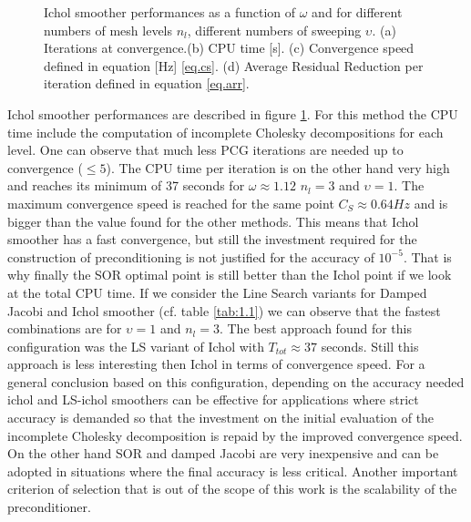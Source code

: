 \begin{figure}[hbt!]
{                                  }
                          \caption{Ichol smoother performances as a function of $\omega$ and for different numbers of mesh levels $n_l$, different numbers of sweeping $\upsilon$. (a) Iterations at convergence.(b) CPU time [s]. (c) Convergence speed defined in equation [Hz] \ref{eq.cs}. (d) Average Residual Reduction per iteration defined in equation \ref{eq.arr}. }
                          \label{f.1.34}
                        \end{figure}  
                        Ichol smoother performances are described in figure \ref{f.1.34}.  For this method the CPU time include the computation of incomplete Cholesky decompositions for each level. One can observe that much less PCG iterations are needed up to convergence ($\leq 5$). The CPU time per iteration is on the other hand very high and reaches its minimum of 37 seconds for $\omega\approx1.12$ $n_l=3$ and $\upsilon=1$. The maximum convergence speed is reached for the same point $C_S\approx 0.64 Hz$ and is bigger than the value found for the other methods. This means that Ichol smoother has a fast convergence, but still the investment required for the construction of preconditioning is not justified for the accuracy of $10^{-5}$. That is why finally the SOR optimal point is still better than the Ichol point if we look at the total CPU time. If we consider the Line Search variants for Damped Jacobi and Ichol smoother (cf. table \ref{tab:1.1}) we can observe that the fastest combinations are for $\upsilon=1$ and $n_l=3$. The best approach found for this configuration was the LS variant of Ichol with $T_{tot}\approx 37$ seconds. Still this approach is less interesting then Ichol in terms of convergence speed. For a general conclusion based on this configuration, depending on the accuracy needed ichol and LS-ichol smoothers can be effective for applications where strict accuracy is demanded so that the investment on the initial evaluation of the incomplete Cholesky decomposition is repaid by the improved convergence speed. On the other hand SOR and damped Jacobi are very inexpensive and can be adopted in situations where the final accuracy is less critical. Another important criterion of selection that is out of the scope of this work is the scalability of the preconditioner.
